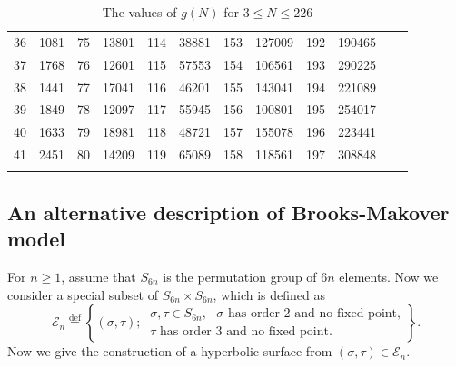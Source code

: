 \documentclass{amsart}
\theoremstyle{plain}
\theoremstyle{definition}
\theoremstyle{remark}
\begin{document}
\begin{table}[htbp]
\begin{tabular}{ @{} cc !{\vrule width 1pt} cc !{\vrule width 1pt} cc !{\vrule width 1pt} cc !{\vrule width 1pt} cc !{\vrule width 1pt} cc @{} }
    36 & 1081 & 75 & 13801 & 114 & 38881 & 153 & 127009 & 192 & 190465 &  &  \\
    37 & 1768 & 76 & 12601 & 115 & 57553 & 154 & 106561 & 193 & 290225 &  &  \\
    38 & 1441 & 77 & 17041 & 116 & 46201 & 155 & 143041 & 194 & 221089 &  &  \\
    39 & 1849 & 78 & 12097 & 117 & 55945 & 156 & 100801 & 195 & 254017 &  &  \\
    40 & 1633 & 79 & 18981 & 118 & 48721 & 157 & 155078 & 196 & 223441 &  &  \\
    41 & 2451 & 80 & 14209 & 119 & 65089 & 158 & 118561 & 197 & 308848 &  &  \\

    \bottomrule
     \vspace{.1in}
    \end{tabular}
    \caption{The values of $g(N)$ for $3\leq N\leq 226$ \label{tab:genera}}  
    \end{table}




\subsection{An alternative description of Brooks-Makover model}\label{sub-descri}
For $n\geq 1$, assume that $S_{6n}$ is the permutation group of $6n$ elements. Now we consider a special subset of $S_{6n}\times S_{6n}$, which is defined as
$$\mathcal{E}_n\overset{\mathrm{def}}{=}\left\{(\sigma,\tau);\ \begin{matrix}\sigma,\tau\in S_{6n},\text{ $\sigma$ has order $2$ and no fixed point,}\\ \text{$\tau$ has order $3$ and no fixed point}.\end{matrix}\right\}.$$
Now we give the construction of a hyperbolic surface from $(\sigma,\tau) \in \mathcal{E}_n$.
\end{document}
